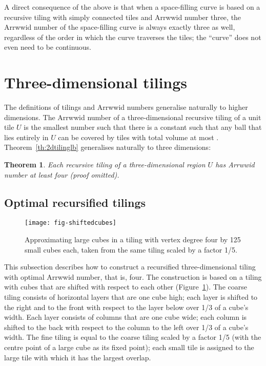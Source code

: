 \documentclass[11pt,a4paper]{article}
\newcommand{\unittile}{\ensuremath{U}\xspace}
\newtheorem{theorem}{Theorem}
\begin{document}
A direct consequence of the above is that when a space-filling curve is based on a recursive tiling with simply connected tiles and Arrwwid number three, the Arrwwid number of the space-filling curve is always exactly three as well, regardless of the order in which the curve traverses the tiles; the ``curve'' does not even need to be continuous.

\section{Three-dimensional tilings}
The definitions of tilings and Arrwwid numbers generalise naturally to higher dimensions. The Arrwwid number of a three-dimensional recursive tiling of a unit tile \unittile is the smallest number  such that there is a constant  such that any ball  that lies entirely in \unittile can be covered by  tiles with total volume at most . Theorem~\ref{th:2dtilinglb} generalises naturally to three dimensions:
\begin{theorem}\label{th:3dtilinglb}
Each recursive tiling of a three-dimensional region \unittile has Arrwwid number at least four
(proof omitted).
\end{theorem}

\subsection{Optimal recursified tilings}\label{sec:3drecursified}

\begin{figure}
\centering
\texttt{[image: fig-shiftedcubes]}
\caption{Approximating large cubes in a tiling with vertex degree four by 125 small cubes each, taken from the same tiling scaled by a factor 1/5.}
\label{fig:shiftedcubes}
\end{figure}

\label{sec:3dshiftedcubes}
This subsection describes how to construct a recursified three-dimensional tiling with optimal Arrwwid number, that is, four. The construction is based on a tiling with cubes that are shifted with respect to each other (Figure~\ref{fig:shiftedcubes}). The coarse tiling consists of horizontal layers that are one cube high; each layer is shifted to the right and to the front with respect to the layer below over 1/3 of a cube's width. Each layer consists of columns that are one cube wide; each column is shifted to the back with respect to the column to the left over 1/3 of a cube's width. The fine tiling is equal to the coarse tiling scaled by a factor 1/5 (with the centre point of a large cube as its fixed point); each small tile is assigned to the large tile with which it has the largest overlap.
\end{document}
